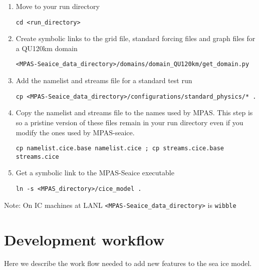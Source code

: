 \documentclass{article}
\begin{document}
\begin{enumerate}

\item Move to your run directory

\verb+cd <run_directory>+

\item Create symbolic links to the grid file, standard forcing files and graph files for a QU120km domain

\verb+<MPAS-Seaice_data_directory>/domains/domain_QU120km/get_domain.py+

\item Add the namelist and streams file for a standard test run

\verb+cp <MPAS-Seaice_data_directory>/configurations/standard_physics/* .+

\item Copy the namelist and streams file to the names used by MPAS. This step is so a pristine version of these files remain in your run directory even if you modify the ones used by MPAS-seaice.

\verb+cp namelist.cice.base namelist.cice ; cp streams.cice.base streams.cice+

\item Get a symbolic link to the MPAS-Seaice executable

\verb+ln -s <MPAS_directory>/cice_model .+

\end{enumerate}

Note: On IC machines at LANL \verb+<MPAS-Seaice_data_directory>+ is \verb+wibble+


\section{Development workflow}
\label{sec:development}

Here we describe the work flow needed to add new features to the sea ice model.
\end{document}
